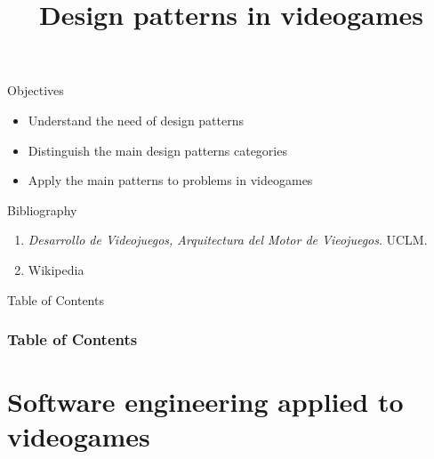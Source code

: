 \documentclass[10pt,compress]{beamer} %
\title[Design patterns in videogames]{Design patterns in videogames}
\author{}
\institute{\asignatura}
\date{}
\begin{document}
{\titlepageBlue
    \begin{frame}
        \titlepage
    \end{frame}
}

\begin{frame}[plain]{}
   \begin{block}{Objectives}
   \begin{itemize}
        \item Understand the need of design patterns
		\item Distinguish the main design patterns categories
		\item Apply the main patterns to problems in videogames
	\end{itemize}
	\end{block}

   \begin{block}{Bibliography}
      \begin{enumerate}
          \item  \textit{Desarrollo de Videojuegos, Arquitectura del Motor de Vieojuegos}. UCLM.
		  \item Wikipedia
      \end{enumerate} 
   \end{block}
\end{frame}

{
\eliminarNavegacion
\begin{frame}[shrink]{Table of Contents}
 \frametitle{Table of Contents}
 \tableofcontents
\end{frame}
}

\section{Software engineering applied to videogames}
\end{document}
